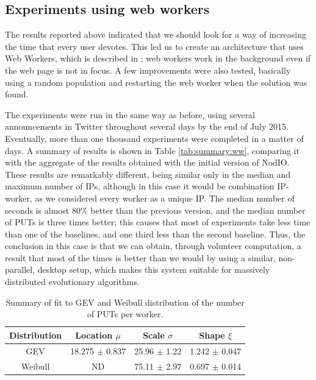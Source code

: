 \documentclass{sig-alternate}
\begin{document}
\subsection{Experiments using web workers}
\label{sec:w2}

The results reported above indicated that we should look for a way of
increasing the time that every user devotes. This led us to create an
architecture that uses Web Workers, which is described in
\cite{2016arXiv160101607Manom}; web workers work in the background even if
the web page is not in focus. A few improvements were also tested,
basically using a random population and restarting the web worker when
the solution was found.

The experiments were run in the same way as before, using several
 announcements in Twitter throughout several days by the end of July
2015. Eventually, more than one thousand experiments were completed in
a matter of days. A summary of results is shown in Table
\ref{tab:summary:ww}, comparing it with the aggregate of the results
obtained with the initial version of {\sf NodIO}. These results are
remarkably different, being similar only in the median and maximum
number of IPs, although in this case it would be combination
IP-worker, as we considered every worker as a unique IP. The median
number of seconds is almost 80\% better than the previous version, and
the median number of PUTs is three times better; this causes that most
of experiments take less time than one of the baselines, and one third
less than the second baseline. Thus, the conclusion in this case is
that we can obtain, through volunteer computation, a result that most 
of the times is better than we would by using a similar, non-parallel,
desktop setup, which makes this system suitable for massively
distributed evolutionary algorithms.
%
\begin{table}
\caption{Summary of fit to GEV and Weibull distribution of
  the number of PUTs per worker. \label{tab:puts:ww}}
\begin{center}
\begin{tabular}{cccc}
\hline
Distribution & Location $\mu$ & Scale $\sigma$ & Shape $\xi$ \\
\hline
GEV & 18.275 $\pm$ 0.837  &  25.96  $\pm$ 1.22 & 1.242   $\pm$ 0.047 \\
Weibull & ND & 75.11 $\pm$ 2.97  & 0.697 $\pm$ 0.014 \\
\hline
\end{tabular}
\end{center}
\end{table}
%
\end{document}
